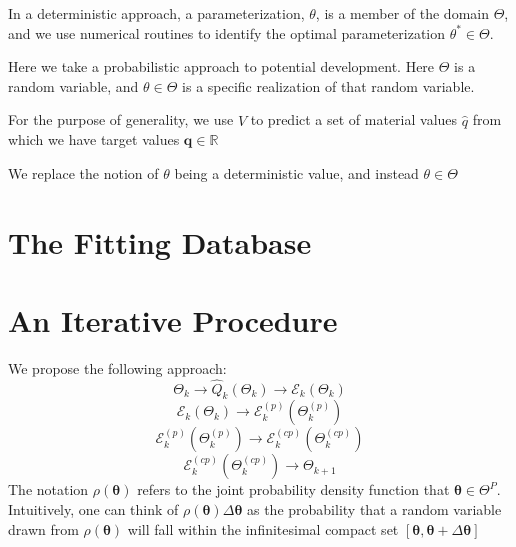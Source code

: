 In a deterministic approach, a parameterization, $\theta$, is a member of the domain $\Theta$, and we use numerical routines to identify the optimal parameterization $\theta^*\in\Theta$.

Here we take a probabilistic approach to potential development.
Here $\Theta$ is a random variable, and $\theta\in\Theta$ is a specific realization of that random variable.

For the purpose of generality, we use $\hat{V}$ to predict a set of material values $\hat{q}$ from which we have target values $\bm{q}\in\mathbb{R}$


We replace the notion of $\theta$ being a deterministic value, and instead $\theta\in\Theta$

\section{The Fitting Database}

\section{An Iterative Procedure}
We propose the following approach:
\begin{equation}
	\Theta_k \rightarrow \hat{Q}_k(\Theta_k) \rightarrow \mathcal{E}_k(\Theta_k)
\end{equation}
\begin{equation}
	\mathcal{E}_k(\Theta_k) \rightarrow \mathcal{E}_k^{(p)}(\Theta_k^{(p)})
\end{equation}
\begin{equation}
	\mathcal{E}_k^{(p)}(\Theta_k^{(p)}) \rightarrow \mathcal{E}_k^{(cp)}(\Theta_k^{(cp)})
\end{equation}
\begin{equation}
	      \mathcal{E}_k^{(cp)}(\Theta_k^{(cp)}) \rightarrow \Theta_{k+1}
\end{equation}
The notation $\rho(\bm{\theta})$ refers to the joint probability density function that $\bm{\theta} \in \Theta^{P}$.
Intuitively, one can think of
$\rho(\bm{\theta})\Delta\bm{\theta}$
as the probability that a random variable drawn from $\rho(\bm{\theta})$ will fall within the infinitesimal compact set $[\bm{\theta},\bm{\theta}+\Delta\bm{\theta}]$

